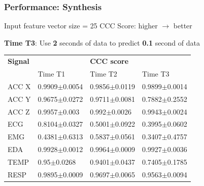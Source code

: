 \documentclass[unknownkeysallowed]{beamer}
\begin{document}
\begin{frame}
\frametitle{Performance: Synthesis}

Input feature vector size = 25 \newline 
CCC Score: higher $\longrightarrow$ better

\textbf{Time T3}: Use \textbf{2} seconds of data to predict \textbf{0.1} second of data

\begin{table}
	\renewcommand{\arraystretch}{1.3}
	\label{syn_ccc_s_list}
	\centering
	\begin{tabular}{llll}
		\hline
		\bfseries Signal  & \bfseries & \bfseries CCC score & \bfseries \\
		       &  Time T1 &  Time T2 & Time T3 \\
		\hline
		ACC X &   0.9909$\pm$0.0054 & 0.9856$\pm$0.0119 & 0.9899$\pm$0.0014 \\
		ACC Y &   0.9675$\pm$0.0272 & 0.9711$\pm$0.0081 & 0.7882$\pm$0.2552 \\
		ACC Z  &   0.9957$\pm$0.003 & 0.992$\pm$0.0026 & 0.9943$\pm$0.0024\\
		ECG &   0.8104$\pm$0.0327 & 0.5001$\pm$0.0922 & 0.3995$\pm$0.0602 \\
		EMG &   0.4381$\pm$0.6313 & 0.5837$\pm$0.0561 & 0.3407$\pm$0.4757 \\
		EDA &   0.9928$\pm$0.0012 & 0.9964$\pm$0.0009 & 0.9927$\pm$0.0036 \\    
		TEMP &  0.95$\pm$0.0268 & 0.9401$\pm$0.0437 & 0.7405$\pm$0.1785 \\
		RESP &  0.9895$\pm$0.0009 & 0.9697$\pm$0.0065 & 0.9563$\pm$0.0094\\
		\hline
	\end{tabular}
\end{table}

\end{frame}



\end{document}
